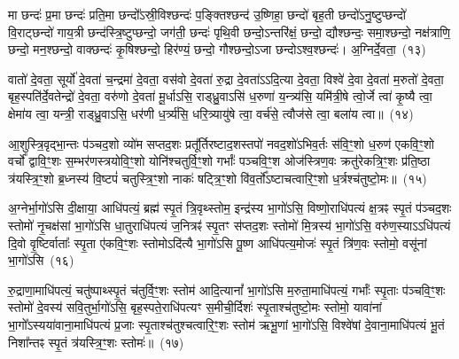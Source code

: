 {\anuvakamend[{छ॒र्दिषा॑ पिन्व॒ षट्च॑}]}

मा छन्दः॑ प्र॒मा छन्दः॑ प्रति॒मा छन्दो᳚\-ऽस्री॒विश्छन्दः॑ प॒ङ्क्तिश्छन्द॑ उ॒ष्णिहा॒ छन्दो॑ बृह॒ती छन्दो॑\-ऽनु॒ष्टुप्छन्दो॑ वि॒राट्छन्दो॑ गाय॒त्री छन्द॑स्\-त्रि॒ष्टुप्छन्दो॒ जग॑ती॒ छन्दः॑ पृथि॒वी छन्दो॒\-ऽन्तरि॑क्षं॒ छन्दो॒ द्यौश्छन्दः॒ समा॒श्छन्दो॒ नक्ष॑त्राणि॒ छन्दो॒ मन॒श्छन्दो॒ वाक्छन्दः॑ कृ॒षिश्छन्दो॒ हिर॑ण्यं॒ छन्दो॒ गौश्छन्दो॒\-ऽजा छन्दो\-ऽश्व॒श्छन्दः॑। अ॒ग्निर्दे॒वता॒~(१३)\ip

वातो॑ दे॒वता॒ सूर्यो॑ दे॒वता॑ च॒न्द्रमा॑ दे॒वता॒ वस॑वो दे॒वता॑ रु॒द्रा दे॒वता॑ऽऽदि॒त्या दे॒वता॒ विश्वे॑ दे॒वा दे॒वता॑ म॒रुतो॑ दे॒वता॒ बृह॒स्पति॑र्दे॒वतेन्द्रो॑ दे॒वता॒ वरु॑णो दे॒वता॑ मू॒र्धाऽसि॒ राड्ध्रु॒वाऽसि॑ ध॒रुणा॑ य॒न्त्र्य॑सि॒ यमि॑त्री॒षे त्वो॒र्जे त्वा॑ कृ॒ष्यै त्वा॒ क्षेमा॑य त्वा॒ यन्त्री॒ राड्ध्रु॒वाऽसि॒ धर॑णी ध॒र्त्र्य॑सि॒ धरि॒त्र्यायु॑षे त्वा॒ वर्च॑से॒ त्वौज॑से त्वा॒ बला॑य त्वा॥~(१४)\ip

{\anuvakamend[{दे॒वता\-ऽऽ\-यु॑षे त्वा॒ षट्च॑}]}

आ॒शुस्त्रि॒वृद्भा॒न्तः प॑ञ्चद॒शो व्यो॑म सप्तद॒शः प्रतू᳚र्तिरष्टाद॒शस्तपो॑ नवद॒शो॑\-ऽभिव॒र्तः स॑वि॒ꣳ॒शो ध॒रुण॑ एकवि॒ꣳ॒शो वर्चो᳚ द्वा\-वि॒ꣳ॒शः स॒म्भर॑णस्त्रयो\-वि॒ꣳ॒शो योनि॑श्चतुर्वि॒ꣳ॒शो गर्भाः᳚ पञ्च\-वि॒ꣳ॒श ओज॑स्\-त्रिण॒वः क्रतु॑रेकत्रि॒ꣳ॒शः प्र॑ति॒ष्ठा त्र॑यस्त्रि॒ꣳ॒शो ब्र॒ध्नस्य॑ वि॒ष्टपं॑ चतुस्\-त्रि॒ꣳ॒शो नाकः॑ षट्त्रि॒ꣳ॒शो वि॑व॒र्तो᳚\-ऽष्टाचत्वारि॒ꣳ॒शो ध॒र्त्रश्च॑तुष्टो॒मः॥~(१५)\ip

{\anuvakamend[{आ॒शुः स॒प्तत्रिꣳ॑शत्}]}

अ॒ग्नेर्भा॒गो॑\-ऽसि दी॒क्षाया॒ आधि॑पत्यं॒ ब्रह्म॑ स्पृ॒तं त्रि॒वृथ्स्तोम॒ इन्द्र॑स्य भा॒गो॑\-ऽसि॒ विष्णो॒राधि॑पत्यं क्ष॒त्रꣴ स्पृ॒तं प॑ञ्चद॒शः स्तोमो॑ नृ॒चक्ष॑सां भा॒गो॑\-ऽसि धा॒तुराधि॑पत्यं ज॒नित्रꣴ॑ स्पृ॒तꣳ स॑प्तद॒शः स्तोमो॑ मि॒त्रस्य॑ भा॒गो॑\-ऽसि॒ वरु॑ण॒स्या\-ऽऽधि॑पत्यं दि॒वो वृ॒ष्टिर्वाताः᳚ स्पृ॒ता ए॑क\-वि॒ꣳ॒शः स्तोमो\-ऽदि॑त्यै भा॒गो॑\-ऽसि पू॒ष्ण आधि॑पत्य॒मोजः॑ स्पृ॒तं त्रि॑ण॒वः स्तोमो॒ वसू॑नां भा॒गो॑\-ऽसि~(१६)\ip

रु॒द्राणा॒माधि॑पत्यं॒ चतु॑ष्पाथ्स्पृ॒तं च॑तुर्वि॒ꣳ॒शः स्तोम॑ आदि॒त्यानां᳚ भा॒गो॑\-ऽसि म॒रुता॒माधि॑पत्यं॒ गर्भाः᳚ स्पृ॒ताः प॑ञ्च\-वि॒ꣳ॒शः स्तोमो॑ दे॒वस्य॑ सवि॒तुर्भा॒गो॑\-ऽसि॒ बृह॒स्पते॒राधि॑पत्यꣳ स॒मीची॒र्दिशः॑ स्पृ॒ताश्च॑तुष्टो॒मः स्तोमो॒ यावा॑नां भा॒गो᳚\-ऽस्यया॑वाना॒माधि॑पत्यं प्र॒जाः स्पृ॒ताश्च॑तुश्चत्वारि॒ꣳ॒शः स्तोम॑ ऋभू॒णां भा॒गो॑\-ऽसि॒ विश्वे॑षां दे॒वाना॒माधि॑पत्यं भू॒तं निशा᳚न्तꣴ स्पृ॒तं त्र॑यस्त्रि॒ꣳ॒शः स्तोमः॑॥~(१७)\ip

{\anuvakamend[{वसू॑नां भा॒गो॑\-ऽसि॒ षट्च॑त्वारिꣳशच्च}]}

